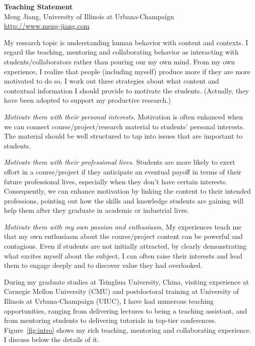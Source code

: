 \documentclass[10.5pt]{article}
\begin{document}
\begin{center}
{\LARGE \bf Teaching Statement} \\
\vskip 0.05in
{\large Meng Jiang, University of Illinois at Urbana-Champaign} \\
{\url{http://www.meng-jiang.com}}
\vskip -0.1in
\end{center}

My research topic is understanding human behavior with content and contexts. I regard the teaching, mentoring and collaborating behavior as interacting with students/collaborators rather than pouring our my own mind. From my own experience, I realize that people (including myself) produce more if they are more motivated to do so. I work out three strategies about what content and contextual information I should provide to motivate the students. (Actually, they have been adopted to support my productive research.)
\begin{compactitem}
\item \textit{Motivate them with their personal interests.} Motivation is often enhanced when we can connect course/project/research material to students' personal interests. The material should be well structured to tap into issues that are important to students. %
\item \textit{Motivate them with their professional lives.} Students are more likely to exert effort in a course/project if they anticipate an eventual payoff in terms of their future professional lives, especially when they don't have certain interests. Consequently, we can enhance motivation by linking the content to their intended professions, pointing out how the skills and knowledge students are gaining will help them after they graduate in academic or industrial lives.
\item \textit{Motivate them with my own passion and enthusiasm.} My experiences teach me that my own enthusiasm about the course/project content can be powerful and contagious. Even if students are not initially attracted, by clearly demonstrating what excites myself about the subject, I can often raise their interests and lead them to engage deeply and to discover value they had overlooked.
\end{compactitem}
During my graduate studies at Tsinghua University, China, visiting experience at Carnegie Mellon University (CMU) and postdoctoral training at University of Illinois at Urbana-Champaign (UIUC), I have had numerous teaching opportunities, ranging from delivering lectures to being a teaching assistant, and from mentoring students to delivering tutorials in top-tier conferences. Figure~\ref{fig:intro} shows my rich teaching, mentoring and collaborating experience. I discuss below the details of it.
\end{document}
